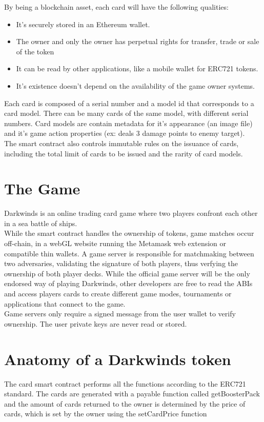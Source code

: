 \documentclass[11pt,twocolumn]{article}
\begin{document}
By being a blockchain asset, each card will have the following qualities:

\begin{itemize}
        \item It's securely stored in an Ethereum wallet.
        \item The owner and only the owner has perpetual rights for transfer, trade or sale of the token
        \item It can be read by other applications, like a mobile wallet for ERC721 tokens.
        \item It's existence doesn't depend on the availability of the game owner systems.
\end{itemize}

Each card is composed of a serial number and a model id that corresponds to a card model. There can be many cards of the same model, with different serial numbers. Card models are contain metadata for it's appearance (an image file) and it's game action properties (ex: deals 3 damage points to enemy target).\\

The smart contract also controls immutable rules on the issuance of cards, including the total limit of cards to be issued and the rarity of card models.


\section{The Game}
Darkwinds is an online trading card game where two players confront each other in a sea battle of ships.\\

While the smart contract handles the ownership of tokens, game matches occur off-chain, in a webGL website running the Metamask web extension or compatible thin wallets. A game server is responsible for matchmaking between two adversaries, validating the signature of both players, thus verfying the ownership of both player decks. While the official game server will be the only endorsed way of playing Darkwinds, other developers are free to read the ABIs and access players cards to create different game modes, tournaments or applications that connect to the game.\\

Game servers only require a signed message from the user wallet to verify ownership. The user private keys are never read or stored.


\section{Anatomy of a Darkwinds token}
The card smart contract performs all the functions according to the ERC721 \cite{notes} standard. The cards are generated with a payable function called getBoosterPack and the amount of cards returned to the owner is determined by the price of cards, which is set by the owner using the setCardPrice function
\end{document}
